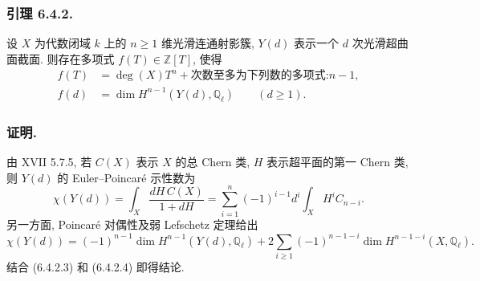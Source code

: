 \subsubsection*{引理 6.4.2.}
设 $X$ 为代数闭域 $k$ 上的 $n\ge1$ 维光滑连通射影簇, $Y(d)$ 表示一个 $d$ 次光滑超曲面截面. 则存在多项式 $f(T)\in\mathbb Z[T]$, 使得
\begin{align}
f(T)&=\deg(X)T^n+\text{次数至多为下列数的多项式:}n-1,
  \tag{6.4.2.1}\\
f(d)&=\dim H^{n-1}(Y(d),\mathbb Q_\ell)\qquad(d\ge1).
  \tag{6.4.2.2}
\end{align}

\subsubsection*{证明.}
由 XVII 5.7.5, 若 $C(X)$ 表示 $X$ 的总 Chern 类, $H$ 表示超平面的第一 Chern 类, 则 $Y(d)$ 的 Euler--Poincaré 示性数为
\begin{equation}\tag{6.4.2.3}
\chi(Y(d))
=\int_X\frac{dH\,C(X)}{1+dH}
=\sum_{i=1}^{n}(-1)^{i-1}d^i\int_X H^iC_{n-i}.
\end{equation}
另一方面, Poincaré 对偶性及弱 Lefschetz 定理给出
\begin{equation}\tag{6.4.2.4}
\chi(Y(d))
=(-1)^{n-1}\dim H^{n-1}(Y(d),\mathbb Q_\ell)
+2\sum_{i\ge1}(-1)^{n-1-i}
  \dim H^{n-1-i}(X,\mathbb Q_\ell).
\end{equation}
结合 (6.4.2.3) 和 (6.4.2.4) 即得结论.

